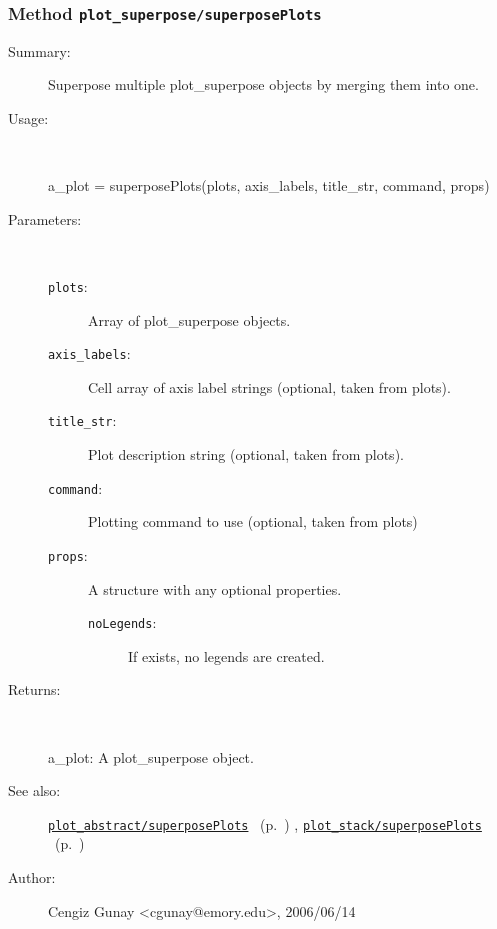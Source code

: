 \subsubsection[Method \texttt{superposePlots}]{Method \texttt{plot\_superpose/superposePlots}}%
%
\label{ref_plot_superpose__superposePlots}%
\hypertarget{ref_plot_superpose__superposePlots}{}%
\begin{description}
\item[Summary:]Superpose multiple plot\_superpose objects by merging them into one.
%
\item[Usage:]~%
\begin{lyxcode}%
a\_plot = superposePlots(plots, axis\_labels, title\_str, command, props)
%
\end{lyxcode}%
%
%
\item[Parameters:]~
\begin{description}%
\item[\texttt{plots}:]
 Array of plot\_superpose objects.
\item[\texttt{axis\_labels}:]
 Cell array of axis label strings (optional, taken from plots).
\item[\texttt{title\_str}:]
 Plot description string (optional, taken from plots).
\item[\texttt{command}:]
 Plotting command to use (optional, taken from plots)
\item[\texttt{props}:]
 A structure with any optional properties.
\begin{description}%
\item[\texttt{noLegends}:]
 If exists, no legends are created.
\end{description}%
\end{description}%
%
\item[Returns:]~

	a\_plot: A plot\_superpose object.
%
%
\item[See also:]%
\hyperlink{ref_plot_abstract__superposePlots}{\texttt{plot\_abstract/superposePlots}}%
\ (p.~\pageref{ref_plot_abstract__superposePlots})%
%
, \hyperlink{ref_plot_stack__superposePlots}{\texttt{plot\_stack/superposePlots}}%
\ (p.~\pageref{ref_plot_stack__superposePlots})%
%
%
\item[Author:]%
Cengiz Gunay <cgunay@emory.edu>, 2006/06/14%
\end{description}
\methodline%
